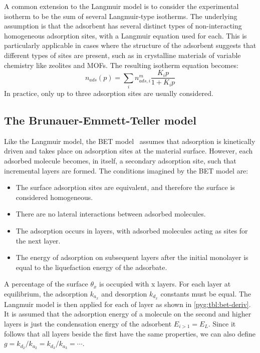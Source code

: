 A common extension to the Langmuir model is to consider
the experimental isotherm to be the sum of several Langmuir-type
isotherms. The underlying assumption is that the adsorbent has 
several distinct types of non-interacting homogeneous adsorption 
sites, with a Langmuir equation used for each. This is particularly
applicable in cases where the structure of the adsorbent
suggests that different types of sites are present,
such as in crystalline materials of variable chemistry like
zeolites and \glspl{MOF}. The resulting isotherm equation becomes:
%
\begin{equation}\label{pyg:eqn:langmulti}
	n_{ads}(p) = \sum_i n_{ads,i}^m\frac{K_i p}{1+K_i p}
\end{equation}
%
In practice, only up to three adsorption sites are usually
considered.

\subsection{The Brunauer-Emmett-Teller model}\label{pyg:models:bet}

Like the Langmuir model, the \gls{BET} model~\cite{brunauerAdsorptionGasesMultimolecular1938}
assumes that adsorption is kinetically driven and takes place on adsorption
sites at the material surface. However, each adsorbed molecule becomes,
in itself, a secondary adsorption site, such that incremental layers
are formed. The conditions imagined by the \gls{BET} model are:

\begin{itemize}
	\item The surface adsorption sites are equivalent, and therefore the
	      surface is considered homogeneous.
	\item There are no lateral interactions between adsorbed
	      molecules.
	\item The adsorption occurs in layers, with adsorbed
	      molecules acting as sites for the next layer.
	\item The energy of adsorption on subsequent layers after 
		  the initial monolayer is equal to the liquefaction energy
		  of the adsorbate.
\end{itemize}

A percentage of the surface \(\theta_x\) is occupied with
x layers. For each layer at equilibrium, the adsorption 
\(k_{a_x}\) and desorption \(k_{d_x}\) constants must be equal.
The Langmuir model is then applied for each of layer
as shown in \autoref{pyg:tbl:bet-deriv}. It is assumed
that the adsorption energy of a molecule on the second
and higher layers is just the condensation energy of the
adsorbent \(E_{i>1} = E_L\). Since it follows that
all layers beside the first have the same properties,
we can also define \(g= {k_{d_2}}/{k_{a_2}} = {k_{d_3}}/{k_{a_3}} =
\cdots \).


